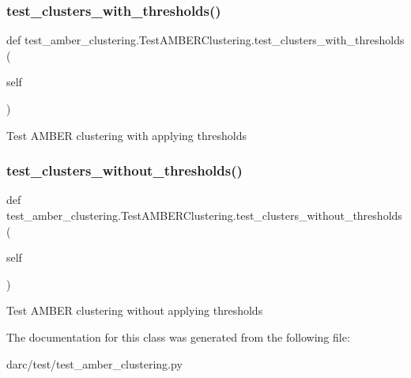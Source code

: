 \subsubsection{\texorpdfstring{test\_clusters\_with\_thresholds()}{test\_clusters\_with\_thresholds()}}
{\footnotesize\ttfamily def test\+\_\+amber\+\_\+clustering.\+Test\+A\+M\+B\+E\+R\+Clustering.\+test\+\_\+clusters\+\_\+with\+\_\+thresholds (\begin{DoxyParamCaption}\item[{}]{self }\end{DoxyParamCaption})}

\begin{DoxyVerb}Test AMBER clustering with applying thresholds
\end{DoxyVerb}
 \mbox{\label{classtest__amber__clustering_1_1_test_a_m_b_e_r_clustering_a22e5b3f3a1c3f56c7cf17f8e566ec058}} 
\subsubsection{\texorpdfstring{test\_clusters\_without\_thresholds()}{test\_clusters\_without\_thresholds()}}
{\footnotesize\ttfamily def test\+\_\+amber\+\_\+clustering.\+Test\+A\+M\+B\+E\+R\+Clustering.\+test\+\_\+clusters\+\_\+without\+\_\+thresholds (\begin{DoxyParamCaption}\item[{}]{self }\end{DoxyParamCaption})}

\begin{DoxyVerb}Test AMBER clustering without applying thresholds
\end{DoxyVerb}
 

The documentation for this class was generated from the following file\+:\begin{DoxyCompactItemize}
\item 
darc/test/test\+\_\+amber\+\_\+clustering.\+py\end{DoxyCompactItemize}
